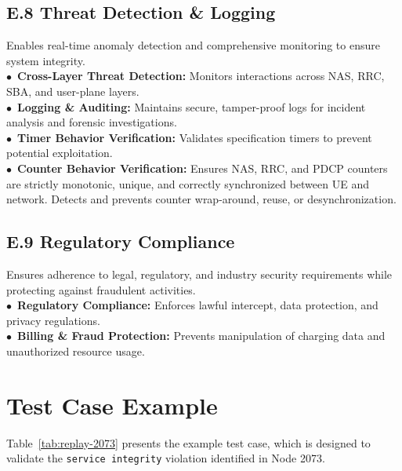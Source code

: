 \subsection*{E.8 Threat Detection \& Logging}
Enables real-time anomaly detection and comprehensive monitoring to ensure system integrity.\\
\noindent$\bullet$~\textbf{Cross-Layer Threat Detection:} Monitors interactions across NAS, RRC, SBA, and user-plane layers.\\
\noindent$\bullet$~\textbf{Logging \& Auditing:} Maintains secure, tamper-proof logs for incident analysis and forensic investigations.\\
\noindent$\bullet$~\textbf{Timer Behavior Verification:} Validates specification timers to prevent potential exploitation.\\
\noindent$\bullet$~\textbf{Counter Behavior Verification:} Ensures NAS, RRC, and PDCP counters are strictly monotonic, unique, and correctly synchronized between UE and network. Detects and prevents counter wrap-around, reuse, or desynchronization.


\subsection*{E.9 Regulatory Compliance}
Ensures adherence to legal, regulatory, and industry security requirements while protecting against fraudulent activities.\\ 
\noindent$\bullet$~\textbf{Regulatory Compliance:} Enforces lawful intercept, data protection, and privacy regulations.\\
\noindent$\bullet$~\textbf{Billing \& Fraud Protection:} Prevents manipulation of charging data and unauthorized resource usage.





\section{Test Case Example}
\label{append:testcase}
Table~\ref{tab:replay-2073} presents the example test case, which is designed to validate the \texttt{service integrity} violation identified in Node 2073.






